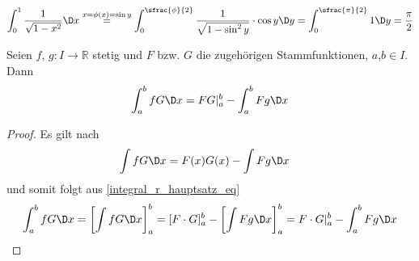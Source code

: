 \begin{example}
	\zeroAmsmathAlignVSpaces*
	\begin{align*}
		\int_0^1 \frac{1}{\sqrt{1 - x^2}} \D x \overset{x = \phi(x) = \sin y}{=} \int_0^{\sfrac{\phi}{2}} \frac{1}{\sqrt{1 - \sin^2 y}} \cdot \cos y \D y = \int_0^{\sfrac{\pi}{2}} 1 \D y = \frac{\pi}{2}
	\end{align*}
	\begin{center}\end{center}
\end{example}

\begin{proposition}
	Seien $f$, $g:I\to\mathbb{R}$ stetig und $F$ bzw. $G$ die zugehörigen Stammfunktionen, $a$,$b\in I$. Dann \begin{align*}
		\int_a^b f G \D x = FG|^b_a - \int_a^b F g \D x
	\end{align*}
\end{proposition}

 \begin{proof}
 	Es gilt nach 
 	\begin{align*}
	 	\int f G\D x &= F(x) G(x) - \int F g \D x
 	\end{align*}
 	und somit folgt aus \eqref{integral_r_hauptsatz_eq} \begin{align*}
	 	\int_a^b f G \D x = \left[ \int f G \D x \right]_a^b = [F \cdot G]_a^b - \left[ \int F g \D x \right] _a^b = F \cdot G |_a^b - \int_a^b F g \D x
 	\end{align*}
 \end{proof}

